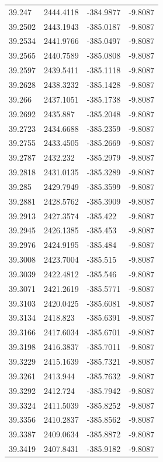 \begin{table}[H]
\begin{tabular}{llll}
39.247 & 2444.4118 & -384.9877 & -9.8087 \\
39.2502 & 2443.1943 & -385.0187 & -9.8087 \\
39.2534 & 2441.9766 & -385.0497 & -9.8087 \\
39.2565 & 2440.7589 & -385.0808 & -9.8087 \\
39.2597 & 2439.5411 & -385.1118 & -9.8087 \\
39.2628 & 2438.3232 & -385.1428 & -9.8087 \\
39.266 & 2437.1051 & -385.1738 & -9.8087 \\
39.2692 & 2435.887 & -385.2048 & -9.8087 \\
39.2723 & 2434.6688 & -385.2359 & -9.8087 \\
39.2755 & 2433.4505 & -385.2669 & -9.8087 \\
39.2787 & 2432.232 & -385.2979 & -9.8087 \\
39.2818 & 2431.0135 & -385.3289 & -9.8087 \\
39.285 & 2429.7949 & -385.3599 & -9.8087 \\
39.2881 & 2428.5762 & -385.3909 & -9.8087 \\
39.2913 & 2427.3574 & -385.422 & -9.8087 \\
39.2945 & 2426.1385 & -385.453 & -9.8087 \\
39.2976 & 2424.9195 & -385.484 & -9.8087 \\
39.3008 & 2423.7004 & -385.515 & -9.8087 \\
39.3039 & 2422.4812 & -385.546 & -9.8087 \\
39.3071 & 2421.2619 & -385.5771 & -9.8087 \\
39.3103 & 2420.0425 & -385.6081 & -9.8087 \\
39.3134 & 2418.823 & -385.6391 & -9.8087 \\
39.3166 & 2417.6034 & -385.6701 & -9.8087 \\
39.3198 & 2416.3837 & -385.7011 & -9.8087 \\
39.3229 & 2415.1639 & -385.7321 & -9.8087 \\
39.3261 & 2413.944 & -385.7632 & -9.8087 \\
39.3292 & 2412.724 & -385.7942 & -9.8087 \\
39.3324 & 2411.5039 & -385.8252 & -9.8087 \\
39.3356 & 2410.2837 & -385.8562 & -9.8087 \\
39.3387 & 2409.0634 & -385.8872 & -9.8087 \\
39.3419 & 2407.8431 & -385.9182 & -9.8087 \\

\end{tabular}
\end{table}
